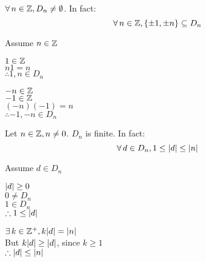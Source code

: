 \documentclass[letterpaper,12pt,fleqn]{article}
\begin{document}
\begin{theorem}
  $\forall\,n\in\mathbb{Z},D_n\ne\emptyset$. In fact:
  \[\forall\,n\in\mathbb{Z},\{\pm1,\pm n\}\subseteq D_n\]
\end{theorem}

\begin{theproof}
  Assume $n\in\mathbb{Z}$

  \begin{minipage}[t]{2in}
    $1\in\mathbb{Z}$ \\
    $n1=n$ \\
    $\therefore 1,n\in D_n$
  \end{minipage}
  \begin{minipage}[t]{2in}
    $-n\in\mathbb{Z}$ \\
    $-1\in\mathbb{Z}$ \\
    $(-n)(-1)=n$ \\
    $\therefore -1,-n\in D_n$
  \end{minipage}
\end{theproof}

\begin{theorem}
  Let $n\in\mathbb{Z},n\ne0$. $D_n$ is finite. In fact:
  \[\forall\,d\in D_n,1\le\lvert d\rvert\le\lvert n\rvert\]
\end{theorem}

\begin{theproof}
  Assume $d\in D_n$

  $\lvert d\rvert\ge0$ \\
  $0\ne D_n$ \\
  $1\in D_n$ \\
  $\therefore 1\le\lvert d\rvert$

  $\exists\,k\in\mathbb{Z}^+,k\lvert d\rvert=\lvert n\rvert$ \\
  But $k\lvert d\rvert\ge \lvert d\rvert$, since $k\ge1$ \\
  $\therefore \lvert d\rvert\le\lvert n\rvert$
\end{theproof}
\end{document}
